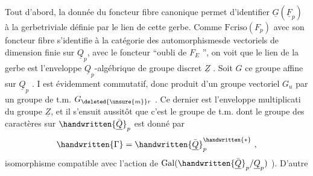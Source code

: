  Tout d'abord, la donnée du foncteur fibre canonique permet d'identifier $\underline{G}(\underline{F}_p)$ à la gerbe\handwritten{\,}triviale définie par le lien  de cette gerbe. Comme $\mathrm{Fcriso}(F_p)$ avec son foncteur fibre s'identifie à la catégorie des automorphismesde vectoriels de dimension finie sur $\underline{Q}_p$, avec le foncteur ``oubli de $F_E$ '', on voit que le lien de la gerbe est l'enveloppe $\underline{Q}_p$-algébrique de groupe discret $\underline{Z}$ . Soit $G$ ce groupe affine sur $\underline{Q}_p$ . I est évidemment commutatif, donc produit d'un groupe vectoriel $G_u$ par un groupe de t.m. $G_{\deleted{\unsure{m}}r}$ .
Ce dernier est l'enveloppe  multiplicati du groupe $\underline{Z}$, et il s'ensuit aussitôt que c'est le groupe de t.m. dont le groupe des caractères sur $\handwritten{\bar{\underline{Q}}}_p$ est donné par
\[
\handwritten{\Gamma}=\handwritten{\bar{\underline{Q}}}_p^{\handwritten{*}}\ ,
\]
\handwritten{(}isomorphisme compatible avec l'action de $\operatorname{Gal}(\handwritten{\bar{\underline{Q}}}_p/\underline{Q}_p)$ ). D'autre
